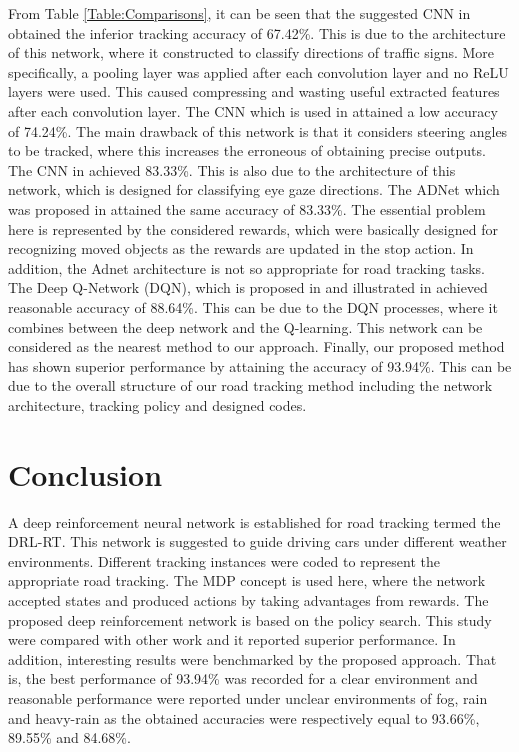 \documentclass{svproc}
\begin{document}
From Table \ref{Table:Comparisons}, it can be seen that the suggested CNN in \cite{Karaduman2017Deep} obtained the inferior tracking accuracy of 67.42\%. This is due to the architecture of this network, where it constructed to classify directions of traffic signs. More specifically, a pooling layer was applied after each convolution layer and no ReLU layers were used. This caused compressing and wasting useful extracted features after each convolution layer. The CNN which is used in \cite{bojarski2016end} attained a low accuracy of 74.24\%. The main drawback of this network is that it considers steering angles to be tracked, where this increases the erroneous of obtaining precise outputs. The CNN in \cite{George2016Real} achieved 83.33\%. This is also due to the architecture of this network, which is designed for classifying eye gaze directions. The ADNet which was proposed in \cite{Yun2017Action,Yun2018Action} attained the same accuracy of 83.33\%. 
The essential problem here is represented by the considered rewards, which were basically designed %
for recognizing moved objects as the rewards are updated in the stop action. In addition, the Adnet architecture is not so appropriate for road tracking tasks. The Deep Q-Network (DQN), which is proposed in \cite{mnih2015human} and illustrated in \cite{arulkumaran2017brief} achieved reasonable accuracy of 88.64\%. This can be due to the DQN processes, where it combines between the deep network and the Q-learning. This network can be considered as the nearest method to our approach. Finally, our proposed method has shown superior performance by attaining the accuracy of 93.94\%. This can be due to the overall structure of our road tracking method including the network architecture, tracking policy and designed codes.

\section{Conclusion}
A deep reinforcement neural network is established for road tracking termed the DRL-RT. This network is suggested to guide driving cars under different weather environments. Different tracking instances were coded to represent the appropriate road tracking. The MDP concept is used here, where the network accepted states and produced actions by taking advantages from rewards. The proposed deep reinforcement network is based on the policy search. This study were compared with other work and it reported superior performance. In addition, interesting results were benchmarked by the proposed approach. That is, the best performance of 93.94\% was recorded for a clear environment and reasonable performance were reported under unclear environments of fog, rain and heavy-rain as the obtained accuracies were respectively equal to 93.66\%, 89.55\% and 84.68\%. 
\end{document}
